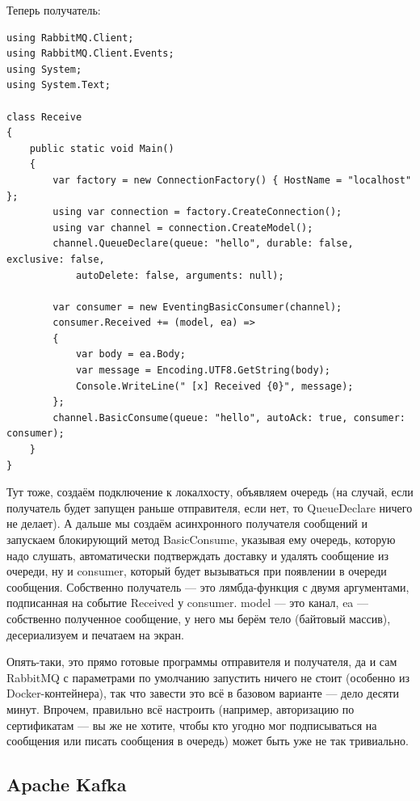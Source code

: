 \documentclass[a5paper]{article}
\begin{document}
Теперь получатель:

\begin{verbatim}
using RabbitMQ.Client;
using RabbitMQ.Client.Events;
using System;
using System.Text;

class Receive
{
    public static void Main()
    {
        var factory = new ConnectionFactory() { HostName = "localhost" };
        using var connection = factory.CreateConnection();
        using var channel = connection.CreateModel();
        channel.QueueDeclare(queue: "hello", durable: false, exclusive: false, 
            autoDelete: false, arguments: null);

        var consumer = new EventingBasicConsumer(channel);
        consumer.Received += (model, ea) =>
        {
            var body = ea.Body;
            var message = Encoding.UTF8.GetString(body);
            Console.WriteLine(" [x] Received {0}", message);
        };
        channel.BasicConsume(queue: "hello", autoAck: true, consumer: consumer);
    }
}
\end{verbatim}

Тут тоже, создаём подключение к локалхосту, объявляем очередь (на случай, если получатель будет запущен раньше отправителя, если нет, то QueueDeclare ничего не делает). А дальше мы создаём асинхронного получателя сообщений и запускаем блокирующий метод BasicConsume, указывая ему очередь, которую надо слушать, автоматически подтверждать доставку и удалять сообщение из очереди, ну и consumer, который будет вызываться при появлении в очереди сообщения. Собственно получатель --- это лямбда-функция с двумя аргументами, подписанная на событие Received у consumer. model --- это канал, ea --- собственно полученное сообщение, у него мы берём тело (байтовый массив), десериализуем и печатаем на экран.

Опять-таки, это прямо готовые программы отправителя и получателя, да и сам RabbitMQ с параметрами по умолчанию запустить ничего не стоит (особенно из Docker-контейнера), так что завести это всё в базовом варианте --- дело десяти минут. Впрочем, правильно всё настроить (например, авторизацию по сертификатам --- вы же не хотите, чтобы кто угодно мог подписываться на сообщения или писать сообщения в очередь) может быть уже не так тривиально.

\subsection{Apache Kafka}
\end{document}
